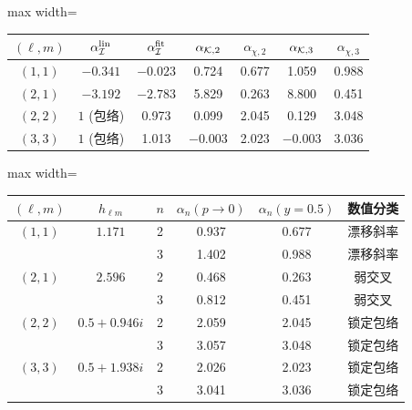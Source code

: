 \documentclass[UTF8,fontset=fandol,11pt,a4paper]{ctexart}
\begin{document}
\par\addvspace{12pt}\noindent\begin{minipage}{\linewidth}
\centering\fontsize{9.5}{12}\selectfont\setlength{\tabcolsep}{3pt}\renewcommand{\arraystretch}{1.18}
\label{audit:tab:cft-factorization}
\begin{adjustbox}{max width=\linewidth}
\begin{tabular}{c c c c c c c}
\toprule
$(\ell,m)$ & $\alpha_{\cal I}^{\rm lin}$ & $\alpha_{\cal I}^{\rm fit}$
& $\alpha_{{\cal K},2}$ & $\alpha_{\chi,2}$
& $\alpha_{{\cal K},3}$ & $\alpha_{\chi,3}$\\
\midrule
$(1,1)$ & $-0.341$ & $-0.023$ & 0.724 & 0.677 & 1.059 & 0.988\\
$(2,1)$ & $-3.192$ & $-2.783$ & 5.829 & 0.263 & 8.800 & 0.451\\
$(2,2)$ & $1$ (包络) & 0.973 & 0.099 & 2.045 & 0.129 & 3.048\\
$(3,3)$ & $1$ (包络) & 1.013 & $-0.003$ & 2.023 & $-0.003$ & 3.036\\
\bottomrule\end{tabular}\end{adjustbox}
\end{minipage}\par\addvspace{9pt}


\par\addvspace{12pt}\noindent\begin{minipage}{\linewidth}
\centering\fontsize{9.5}{12}\selectfont\setlength{\tabcolsep}{3pt}\renewcommand{\arraystretch}{1.18}
\label{audit:tab:power-modal}
\begin{adjustbox}{max width=\linewidth}
\begin{tabular}{c c c c c c}
\toprule
$(\ell,m)$ & $h_{\ell m}$ & $n$ & $\alpha_n(p\to0)$
& $\alpha_n(y=0.5)$ & 数值分类\\
\midrule
$(1,1)$ & $1.171$ & 2 & 0.937 & 0.677 & 漂移斜率\\
        &         & 3 & 1.402 & 0.988 & 漂移斜率\\
$(2,1)$ & $2.596$ & 2 & 0.468 & 0.263 & 弱交叉\\
        &         & 3 & 0.812 & 0.451 & 弱交叉\\
$(2,2)$ & $0.5+0.946i$ & 2 & 2.059 & 2.045 & 锁定包络\\
        &              & 3 & 3.057 & 3.048 & 锁定包络\\
$(3,3)$ & $0.5+1.938i$ & 2 & 2.026 & 2.023 & 锁定包络\\
        &              & 3 & 3.041 & 3.036 & 锁定包络\\
\bottomrule\end{tabular}\end{adjustbox}
\end{minipage}\par\addvspace{9pt}
\end{document}
